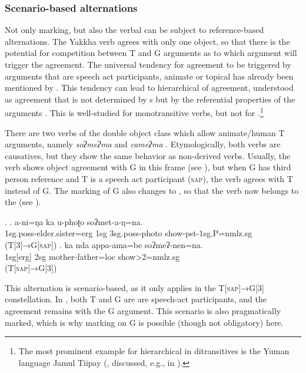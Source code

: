 	
\subsubsection{Scenario-based alternations}\label{scen-based}

Not only  marking, but also the verbal  can be subject to reference-based alternations. The Yakkha verb agrees with only one object, so that there is the potential for competition between T and G arguments as to which argument will trigger the agreement. The universal tendency for agreement to be triggered by arguments that are speech act participants, animate or topical has  already been mentioned by \citet{Givon1976Topic}. This tendency can lead to hierarchical  of agreement, understood as agreement that is not determined by s but by the referential properties of the arguments \citep[66]{Nichols1992Language}. This is well-studied for monotransitive verbs, but not for .\footnote{The most prominent example for hierarchical  in ditransitives is the Yuman language Jamul Tiipay (\citealt[162--163]{Miller2001A-grammar}, discussed, e.g., in \citealt[348]{Siewierska2003Person}).} 
 
There are two verbs of the double object class which allow animate/human T arguments, namely  \emph{soʔmeʔma}  and \emph{cameʔma} . Etymologically, both verbs are causatives, but they show the same behavior as non-derived verbs. Usually, the verb shows object agreement with G in this frame (see \Next[a]), but when G has third person reference and T is a speech act participant (\textsc{sap}), the verb agrees with T instead of G.  The  marking of G also changes to , so that the verb now belongs to the  (see \Next[b]).

\ex. \ag. a-ni=ŋa  ka  u-phoʈo soʔmet-a-ŋ=na.\\
		{\sc 1sg.poss-}elder.sister{\sc =erg} {\sc 1sg} {\sc 3sg.poss-}photo  show{\sc -pst-1sg.P=nmlz.sg}\\
	 (T[3]→G[\textsc{sap}])
\bg. ka nda appa-ama=be soʔmeʔ-nen=na.\\
		 {\sc 1sg[erg]}  {\sc 2sg}  mother-father{\sc =loc} show{>2=nmlz.sg}\\
		 (T[\textsc{sap}]→G[3])
		
This alternation is scenario-based, as it only applies in the T[\textsc{sap}]→G[3] constellation. In \Next, both T and G are are speech-act participants, and the agreement remains with the G argument. This scenario is also pragmatically marked, which is why  marking on G is possible (though not obligatory) here.
	
